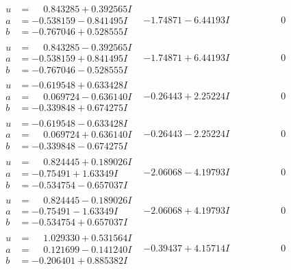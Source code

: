 \documentclass[1p]{elsarticle_modified}
\theoremstyle{definition}
\begin{document}
$$\begin{array}{c|c|c}
\begin{aligned}
u &= \phantom{-}0.843285 + 0.392565 I \\
a &= -0.538159 - 0.841495 I \\
b &= -0.767046 + 0.528555 I\end{aligned}
 & -1.74871 - 6.44193 I & \phantom{-0.000000 } 0 \\ \hline\begin{aligned}
u &= \phantom{-}0.843285 - 0.392565 I \\
a &= -0.538159 + 0.841495 I \\
b &= -0.767046 - 0.528555 I\end{aligned}
 & -1.74871 + 6.44193 I & \phantom{-0.000000 } 0 \\ \hline\begin{aligned}
u &= -0.619548 + 0.633428 I \\
a &= \phantom{-}0.069724 - 0.636140 I \\
b &= -0.339848 + 0.674275 I\end{aligned}
 & -0.26443 + 2.25224 I & \phantom{-0.000000 } 0 \\ \hline\begin{aligned}
u &= -0.619548 - 0.633428 I \\
a &= \phantom{-}0.069724 + 0.636140 I \\
b &= -0.339848 - 0.674275 I\end{aligned}
 & -0.26443 - 2.25224 I & \phantom{-0.000000 } 0 \\ \hline\begin{aligned}
u &= \phantom{-}0.824445 + 0.189026 I \\
a &= -0.75491 + 1.63349 I \\
b &= -0.534754 - 0.657037 I\end{aligned}
 & -2.06068 - 4.19793 I & \phantom{-0.000000 } 0 \\ \hline\begin{aligned}
u &= \phantom{-}0.824445 - 0.189026 I \\
a &= -0.75491 - 1.63349 I \\
b &= -0.534754 + 0.657037 I\end{aligned}
 & -2.06068 + 4.19793 I & \phantom{-0.000000 } 0 \\ \hline\begin{aligned}
u &= \phantom{-}1.029330 + 0.531564 I \\
a &= \phantom{-}0.121699 - 0.141240 I \\
b &= -0.206401 + 0.885382 I\end{aligned}
 & -0.39437 + 4.15714 I & \phantom{-0.000000 } 0 \\ \hline\begin{aligned}

\end{aligned}
\end{array}$$
\end{document}
